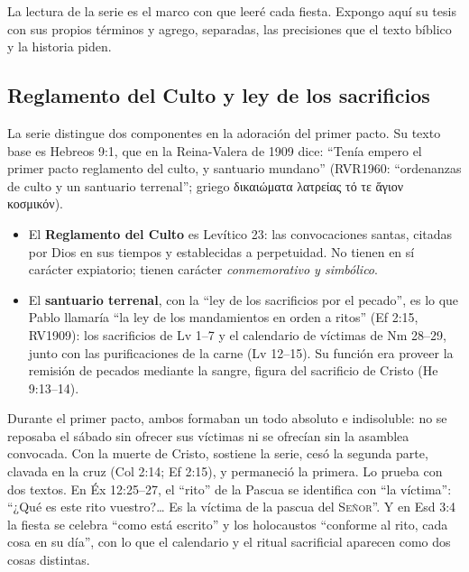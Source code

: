 \documentclass[11pt,letterpaper]{article}
\newcommand{\grc}[1]{\foreignlanguage{ancientgreek}{#1}}
\newcommand{\SENOR}{\textsc{Señor}}
\newcommand{\destacar}[1]{\textbf{\textcolor{tierraroja}{#1}}}
\begin{document}
La lectura de la serie es el marco con que leeré cada fiesta. Expongo aquí su tesis con sus propios términos y agrego, separadas, las precisiones que el texto bíblico y la historia piden.

\subsection{Reglamento del Culto y ley de los sacrificios}
La serie distingue dos componentes en la adoración del primer pacto. Su texto base es Hebreos 9:1, que en la Reina-Valera de 1909 dice: ``Tenía empero el primer pacto reglamento del culto, y santuario mundano'' (RVR1960: ``ordenanzas de culto y un santuario terrenal''; griego \grc{δικαιώματα λατρείας τό τε ἅγιον κοσμικόν}).

\begin{itemize}\setlength{\itemsep}{2pt}
\item El \destacar{Reglamento del Culto} es Levítico 23: las convocaciones santas, citadas por Dios en sus tiempos y establecidas a perpetuidad. No tienen en sí carácter expiatorio; tienen carácter \emph{conmemorativo y simbólico}.
\item El \destacar{santuario terrenal}, con la ``ley de los sacrificios por el pecado'', es lo que Pablo llamaría ``la ley de los mandamientos en orden a ritos'' (Ef 2:15, RV1909): los sacrificios de Lv 1--7 y el calendario de víctimas de Nm 28--29, junto con las purificaciones de la carne (Lv 12--15). Su función era proveer la remisión de pecados mediante la sangre, figura del sacrificio de Cristo (He 9:13--14).
\end{itemize}

Durante el primer pacto, ambos formaban un todo absoluto e indisoluble: no se reposaba el sábado sin ofrecer sus víctimas ni se ofrecían sin la asamblea convocada. Con la muerte de Cristo, sostiene la serie, cesó la segunda parte, clavada en la cruz (Col 2:14; Ef 2:15), y permaneció la primera. Lo prueba con dos textos. En Éx 12:25--27, el ``rito'' de la Pascua se identifica con ``la víctima'': ``¿Qué es este rito vuestro?\ldots{} Es la víctima de la pascua del \SENOR''. Y en Esd 3:4 la fiesta se celebra ``como está escrito'' y los holocaustos ``conforme al rito, cada cosa en su día'', con lo que el calendario y el ritual sacrificial aparecen como dos cosas distintas.
\end{document}
